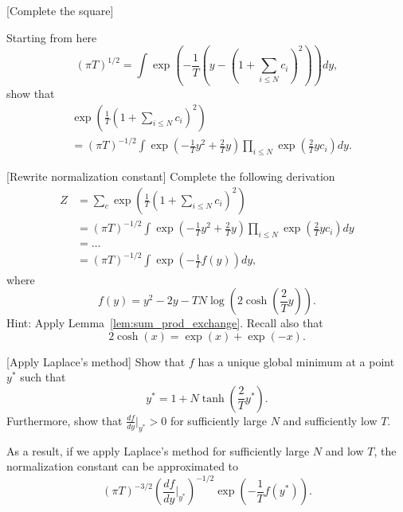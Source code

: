 \begin{exercise}{[Complete the square]}

Starting from here
%
\begin{equation}
\left(\pi T\right)^{1/2} = \int \exp\left(-\frac{1}{T}\left(y - \left(1 + \sum_{i \leq N}c_i\right)^2\right)\right)dy,
\end{equation}
%
show that
%
\begin{align*}
&\exp\left(\frac{1}{T}\left(1 + \sum_{i \leq N}c_i\right)^2\right)\\ 
&= \left(\pi T\right)^{-1/2}\int\exp\left(-\frac{1}{T}y^2 + \frac{2}{T}y\right) \prod_{i \leq N}\exp\left(\frac{2}{T}y c_i\right) dy.
\end{align*}
%
\end{exercise}

\begin{exercise}{[Rewrite normalization constant]}
Complete the following derivation
%
\begin{align}
Z &= \sum_{c} \exp\left(\frac{1}{T}\left(1 + \sum_{i \leq N}c_i\right)^2\right)\\ 
&= \left(\pi T\right)^{-1/2}\int\exp\left(-\frac{1}{T}y^2 + \frac{2}{T}y\right) \prod_{i \leq N}\exp\left(\frac{2}{T}y c_i\right) dy\\
&= \ldots \\
&= \left(\pi T\right)^{-1/2}\int \exp\left(-\frac{1}{T}f(y)\right) dy,\label{eq:norm_cost_ugly_integral}
\end{align}
%
where
%
\begin{equation}
f(y) = y^2 - 2 y - T N \log \left(2 \cosh\left(\frac{2}{T}y\right)\right).
\end{equation}
%
Hint: Apply Lemma~\ref{lem:sum_prod_exchange}. Recall also that
%
\begin{equation}
2 \cosh(x) = \exp(x) + \exp(-x).
\end{equation}
%
\end{exercise}

\begin{exercise}{[Apply Laplace's method]}
Show that $f$ has a unique global minimum at a point $y^*$ such that
%
\begin{equation}
y^* = 1 + N \tanh\left(\frac{2}{T}y^*\right).
\end{equation}
% 
Furthermore, show that $\frac{df}{dy}\bigr|_{y^*} > 0$ for sufficiently large $N$ and sufficiently low $T$.
\end{exercise}

As a result, if we apply Laplace's method for sufficiently large $N$ and low $T$, the normalization constant can be approximated to
%
\begin{equation}
\left(\pi T\right)^{-3/2}\left(\frac{df}{dy}\bigr|_{y^*}\right)^{-1/2}\exp\left(-\frac{1}{T}f(y^*)\right).
\end{equation}
%

